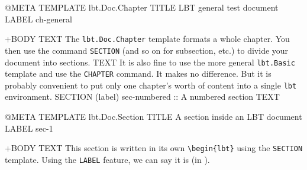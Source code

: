 \documentclass[a4paper,oneside,11pt]{memoir}
\begin{document}
\lbtDraftModeOff{}

\tableofcontents



\begin{lbt}
  @META
    TEMPLATE   lbt.Doc.Chapter
    TITLE      LBT general test document
    LABEL      ch-general

  +BODY
    TEXT The \texttt{lbt.Doc.Chapter} template formats a whole chapter. You then use the command \texttt{SECTION} (and so on for subsection, etc.) to divide your document into sections.
    TEXT It is also fine to use the more general \texttt{lbt.Basic} template and use the \texttt{CHAPTER} command. It makes no difference. But it is probably convenient to put only one chapter's worth of content into a single \texttt{lbt} environment. 
    SECTION (label) sec-numbered :: A numbered section
    TEXT \kant[2-3]
\end{lbt}

\begin{lbt}
  @META
    TEMPLATE   lbt.Doc.Section
    TITLE      A section inside an LBT document
    LABEL      sec-1

  +BODY
    TEXT This section is written in its own \verb|\begin{lbt}| using the \texttt{SECTION} template. Using the \texttt{LABEL} feature, we can say it is  (in ).
\end{lbt}

\end{document}
